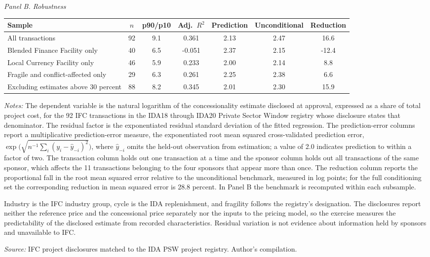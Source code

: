 \begin{table}[htbp]
\vspace{8pt}
\textit{Panel B. Robustness}\\[2pt]
\begin{tabular}{lcccccc}
\toprule
Sample & $n$ & p90/p10 & Adj.\ $R^2$ & Prediction & Unconditional & Reduction \\
\midrule
All transactions & 92 & 9.1 & 0.361 & 2.13 & 2.47 & 16.6 \\
Blended Finance Facility only & 40 & 6.5 & -0.051 & 2.37 & 2.15 & -12.4 \\
Local Currency Facility only & 46 & 5.9 & 0.233 & 2.00 & 2.14 & 8.8 \\
Fragile and conflict-affected only & 29 & 6.3 & 0.261 & 2.25 & 2.38 & 6.6 \\
Excluding estimates above 30 percent & 88 & 8.2 & 0.345 & 2.01 & 2.30 & 15.9 \\
\bottomrule
\end{tabular}
\begin{tablenotes}
\small
\item \textit{Notes:} The dependent variable is the natural logarithm of the concessionality estimate disclosed at approval, expressed as a share of total project cost, for the 92 IFC transactions in the IDA18 through IDA20 Private Sector Window registry whose disclosure states that denominator. The residual factor is the exponentiated residual standard deviation of the fitted regression. The prediction-error columns report a multiplicative prediction-error measure, the exponentiated root mean squared cross-validated prediction error, $\exp\!\big(\sqrt{n^{-1}\sum_i (y_i-\hat{y}_{-i})^2}\big)$, where $\hat{y}_{-i}$ omits the held-out observation from estimation; a value of 2.0 indicates prediction to within a factor of two. The transaction column holds out one transaction at a time and the sponsor column holds out all transactions of the same sponsor, which affects the 11 transactions belonging to the four sponsors that appear more than once. The reduction column reports the proportional fall in the root mean squared error relative to the unconditional benchmark, measured in log points; for the full conditioning set the corresponding reduction in mean squared error is 28.8 percent. In Panel B the benchmark is recomputed within each subsample.
\item Industry is the IFC industry group, cycle is the IDA replenishment, and fragility follows the registry's designation. The disclosures report neither the reference price and the concessional price separately nor the inputs to the pricing model, so the exercise measures the predictability of the disclosed estimate from recorded characteristics. Residual variation is not evidence about information held by sponsors and unavailable to IFC.
\item \textit{Source:} IFC project disclosures matched to the IDA PSW project registry. Author's compilation.
\end{tablenotes}
\end{table}
